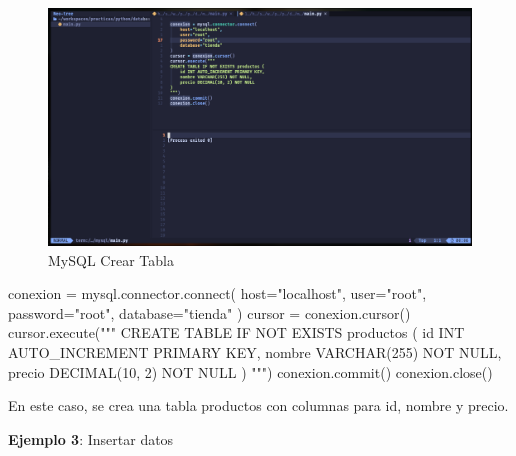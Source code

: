 \documentclass[
  a4paper,
  DIV=11,
  numbers=noendperiod,
  onepage,
  openany]{scrreprt}
\newenvironment{Shaded}{\begin{snugshade}}{\end{snugshade}}
\newcommand{\ExtensionTok}[1]{\textcolor[rgb]{0.00,0.23,0.31}{#1}}
\newcommand{\NormalTok}[1]{\textcolor[rgb]{0.00,0.23,0.31}{#1}}
\newcommand{\OperatorTok}[1]{\textcolor[rgb]{0.37,0.37,0.37}{#1}}
\newcommand{\StringTok}[1]{\textcolor[rgb]{0.13,0.47,0.30}{#1}}
\begin{document}
\begin{figure}[H]

{\centering \includegraphics[width=8.33333in,height=\textheight,keepaspectratio]{unidades/unidad6/./images/mysql_code002.png}

}

\caption{MySQL Crear Tabla}

\end{figure}%

\begin{Shaded}
\begin{Highlighting}[]
\NormalTok{conexion }\OperatorTok{=}\NormalTok{ mysql.connector.}\ExtensionTok{connect}\NormalTok{(}
\NormalTok{    host}\OperatorTok{=}\StringTok{"localhost"}\NormalTok{,}
\NormalTok{    user}\OperatorTok{=}\StringTok{"root"}\NormalTok{,}
\NormalTok{    password}\OperatorTok{=}\StringTok{"root"}\NormalTok{,}
\NormalTok{    database}\OperatorTok{=}\StringTok{"tienda"}
\NormalTok{)}
\NormalTok{cursor }\OperatorTok{=}\NormalTok{ conexion.cursor()}
\NormalTok{cursor.execute(}\StringTok{"""}
\StringTok{CREATE TABLE IF NOT EXISTS productos (}
\StringTok{    id INT AUTO\_INCREMENT PRIMARY KEY,}
\StringTok{    nombre VARCHAR(255) NOT NULL,}
\StringTok{    precio DECIMAL(10, 2) NOT NULL}
\StringTok{)}
\StringTok{"""}\NormalTok{)}
\NormalTok{conexion.commit()}
\NormalTok{conexion.close()}
\end{Highlighting}
\end{Shaded}

En este caso, se crea una tabla productos con columnas para id, nombre y
precio.

\textbf{Ejemplo 3}: Insertar datos
\end{document}
